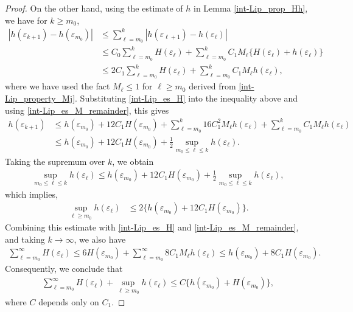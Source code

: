 \documentclass[10pt,a4paper]{amsart}
\begin{document}
\begin{proof}
On the other hand, using the estimate of $h$ in Lemma \ref{int-Lip_prop_Hh}, we have for $k\geq m_0$,
\begin{align*}
  |h(\varepsilon_{k+1})-h(\varepsilon_{m_0})| & \leq \sum_{\ell=m_0}^k|h(\varepsilon_{\ell+1})-h(\varepsilon_\ell)|\\
  &\leq C_0\sum_{\ell=m_0}^k H(\varepsilon_\ell)+\sum_{\ell=m_0}^kC_1M_\ell\{H(\varepsilon_\ell)+h(\varepsilon_\ell)\}\\
  &\leq 2C_1\sum_{\ell=m_0}^k H(\varepsilon_\ell)+\sum_{\ell=m_0}^kC_1M_\ell h(\varepsilon_\ell),
\end{align*}
where we have used the fact $M_\ell\leq 1$ for $\ell\geq m_0$ derived from \eqref{int-Lip_property_Mj}. Substituting \eqref{int-Lip_es_H} into the inequality above and using \eqref{int-Lip_es_M_remainder}, this gives
\begin{align*}
  h(\varepsilon_{k+1})&\leq h(\varepsilon_{m_0})+ 12C_1H(\varepsilon_{m_0})+\sum_{\ell=m_0}^{k}16C_1^2M_\ell h(\varepsilon_\ell)+\sum_{\ell=m_0}^kC_1M_\ell h(\varepsilon_\ell)\\
  & \leq h(\varepsilon_{m_0})+ 12C_1H(\varepsilon_{m_0})+\frac{1}{2}\sup_{m_0 \leq \ell\leq k}h(\varepsilon_\ell).
\end{align*}
Taking the supremum over $k$, we obtain
\begin{align*}
  \sup_{m_0 \leq \ell\leq k}h(\varepsilon_{\ell})\leq h(\varepsilon_{m_0})+ 12C_1H(\varepsilon_{m_0})+\frac{1}{2}\sup_{m_0 \leq \ell\leq k}h(\varepsilon_\ell),
\end{align*}
which implies, 
\begin{align*}
  \sup_{\ell \ge m_0} h(\varepsilon_{\ell})&\leq 2\{h(\varepsilon_{m_0})+ 12C_1H(\varepsilon_{m_0})\}. 
\end{align*}
Combining this estimate with \eqref{int-Lip_es_H} and \eqref{int-Lip_es_M_remainder}, and taking $k\to \infty$, we also have
\begin{align*}
  \sum_{\ell=m_0}^{\infty} H(\varepsilon_\ell)\leq 6H(\varepsilon_{m_0})+\sum_{\ell=m_0}^{\infty}8C_1M_\ell h(\varepsilon_\ell)\leq h(\varepsilon_{m_0})+8C_1H(\varepsilon_{m_0}). 
\end{align*}
Consequently, we conclude that
\begin{align}\label{est.m0-infity}
  \sum_{\ell = m_0}^\infty H(\varepsilon_\ell) + \sup_{\ell \ge m_0} h(\varepsilon_\ell)\leq C\{h(\varepsilon_{m_0})+H(\varepsilon_{m_0})\},
\end{align}
where $C$ depends only on $C_1$.


\end{proof}
\end{document}
